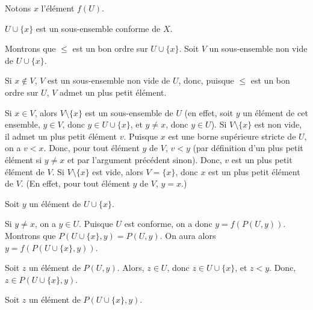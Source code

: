    \done

\blank[medium]

Notons $x$ l'élément $f(U)$. 

\blank[medium]

\noindent{} $U \cup \lbrace x \rbrace$ est un sous-ensemble conforme de $X$.

\blank[medium]

\noindent{} 
\startitemize
    \item Montrons que $\leq$ est un bon ordre sur $U \cup \lbrace x \rbrace$.
        Soit $V$ un sous-ensemble non vide de $U \cup \lbrace x \rbrace$.
        \startitemize[nowhite]
            \item Si $x \notin V$, $V$ est un sous-ensemble non vide de $U$, donc, puisque $\leq$ est un bon ordre sur $U$, $V$ admet un plus petit élément.
            \item Si $x \in V$, alors $V \setminus \lbrace x \rbrace$ est un sous-ensemble de $U$ (en effet, soit $y$ un élément de cet ensemble, $y \in V$, donc $y \in U \cup \lbrace x \rbrace$, et $y \neq x$, donc $y \in U$).
                Si $V \setminus \lbrace x \rbrace$ est non vide, il admet un plus petit élément $v$. 
                Puisque $x$ est une borne supérieure stricte de $U$, on a $v < x$. 
                Donc, pour tout élément $y$ de $V$, $v < y$ (par définition d'un plus petit élément si $y \neq x$ et par l'argument précédent sinon). 
                Donc, $v$ est un plus petit élément de $V$.
                Si $V \setminus \lbrace x \rbrace$ est vide, alors $V = \lbrace x \rbrace$, donc $x$ est un plus petit élément de $V$.
                (En effet, pour tout élément $y$ de $V$, $y = x$.)
        \stopitemize
    \item Soit $y$ un élément de $U \cup \lbrace x \rbrace$.
        \startitemize[nowhite]
            \item Si $y \neq x$, on a $y \in U$. 
                Puisque $U$ est conforme, on a donc $y = f(P(U, y))$. 
                Montrons que $P(U \cup \lbrace x \rbrace, y) = P(U, y)$.
                On aura alors $y = f(P(U \cup \lbrace x \rbrace, y))$.
                \startitemize[nowhite]
                    \item Soit $z$ un élément de $P(U, y)$.
                        Alors, $z \in U$, donc $z \in U \cup \lbrace x \rbrace$, et $z < y$.
                        Donc, $z \in P(U \cup \lbrace x \rbrace, y)$.
                    \item Soit $z$ un élément de $P(U \cup \lbrace x \rbrace, y)$.
